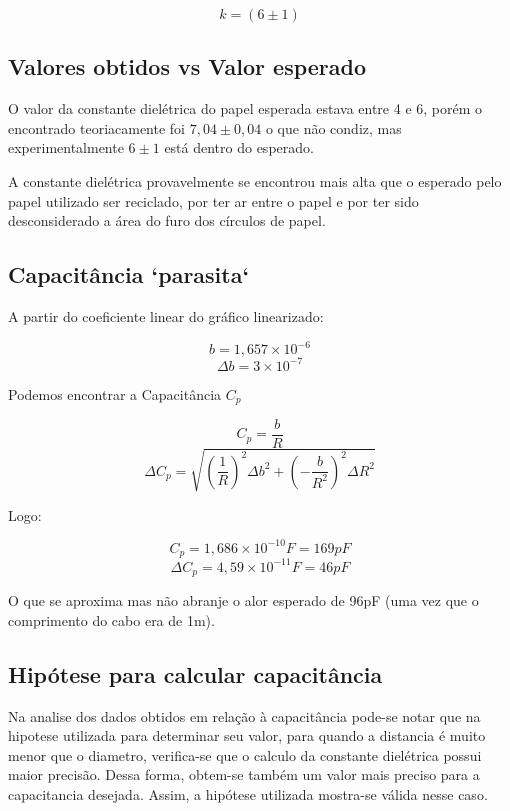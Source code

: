         $$k = (6 \pm 1)$$

    \subsection{Valores obtidos vs Valor esperado}

        O valor da constante dielétrica do papel esperada 
        estava entre 4 e 6, porém o encontrado
        teoriacamente foi $7,04 \pm 0,04$ o 
        que não condiz, mas experimentalmente
        $6 \pm 1$ está dentro do esperado.

        A constante dielétrica provavelmente se encontrou
        mais alta que o esperado pelo papel utilizado ser
        reciclado, por ter ar entre o papel e por ter sido
        desconsiderado a área do furo dos círculos de papel.
    \subsection{Capacitância `parasita`} 

        A partir do coeficiente linear do gráfico linearizado:

        $$b = 1,657\times10^{-6}$$
        $$\Delta b = 3\times10^{-7}$$

        Podemos encontrar a Capacitância  $C_p$

        $$C_p = \frac{b}{R}$$
        $$\Delta C_p = \sqrt{(\frac{1}{R})^2 \Delta b^2 + (-\frac{b}{R^2})^2 \Delta R^2}$$

        Logo:

        $$C_p = 1,686 \times 10^{-10} F = 169 pF$$
        $$\Delta C_p = 4,59\times10^{-11} F = 46 pF$$

        O que se aproxima mas não abranje o alor esperado
        de 96pF (uma vez que o comprimento do cabo
        era de 1m).

    \subsection{Hipótese para calcular capacitância}

            Na analise dos dados obtidos em relação à capacitância pode-se notar que na hipotese utilizada para determinar seu valor, para quando a distancia é muito menor que o diametro, verifica-se que o calculo da constante dielétrica possui maior precisão. 
        Dessa forma, obtem-se também um valor mais preciso para a capacitancia desejada. Assim, a hipótese utilizada mostra-se válida nesse caso. 